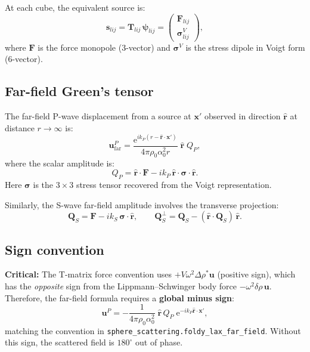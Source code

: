\documentclass[11pt,a4paper]{article}
\newcommand{\D}{\Delta}
\newcommand{\bT}{\bm{T}}
\newcommand{\bs}{\bm{\sigma}}
\newcommand{\bu}{\bm{u}}
\newcommand{\hr}{\hat{\bm{r}}}
\newcommand{\ee}{\mathrm{e}}
\begin{document}
At each cube, the equivalent source is:
\begin{equation}
  \bm{s}_{lij} = \bT_{lij}\,\bm{\psi}_{lij}
  = \begin{pmatrix} \bm{F}_{lij} \\ \bs^V_{lij} \end{pmatrix},
\end{equation}
where $\bm{F}$ is the force monopole (3-vector) and $\bs^V$ is
the stress dipole in Voigt form (6-vector).

\subsection{Far-field Green's tensor}

The far-field P-wave displacement from a source at $\bm{x}'$ observed
in direction $\hr$ at distance $r \to \infty$ is:
\begin{equation}
  \bu^P_{\text{far}} = \frac{\ee^{ik_P(r - \hr \cdot \bm{x}')}}{4\pi\rho_0\alpha_0^2 r}
    \;\hr\;Q_P,
\end{equation}
where the scalar amplitude is:
\begin{equation}\label{eq:QP}
  Q_P = \hr \cdot \bm{F} - ik_P\,\hr \cdot \bs \cdot \hr.
\end{equation}
Here $\bs$ is the $3 \times 3$ stress tensor recovered from the
Voigt representation.

Similarly, the S-wave far-field amplitude involves the transverse
projection:
\begin{equation}
  \bm{Q}_S = \bm{F} - ik_S\,\bs \cdot \hr, \qquad
  \bm{Q}_S^\perp = \bm{Q}_S - (\hr \cdot \bm{Q}_S)\,\hr.
\end{equation}

\subsection{Sign convention}

\textbf{Critical:} The T-matrix force convention uses
$+V\omega^2\D\rho^*\bu$ (positive sign), which has the
\emph{opposite} sign from the Lippmann--Schwinger body force
$-\omega^2\delta\rho\,\bu$.  Therefore, the far-field formula
requires a \textbf{global minus sign}:
\begin{equation}\label{eq:sign}
  \bu^P = -\frac{1}{4\pi\rho_0\alpha_0^2}\;\hr\,Q_P\;
    \ee^{-ik_P \hr \cdot \bm{x}'},
\end{equation}
matching the convention in \texttt{sphere\_scattering.foldy\_lax\_far\_field}.
Without this sign, the scattered field is $180^\circ$ out of phase.
\end{document}
